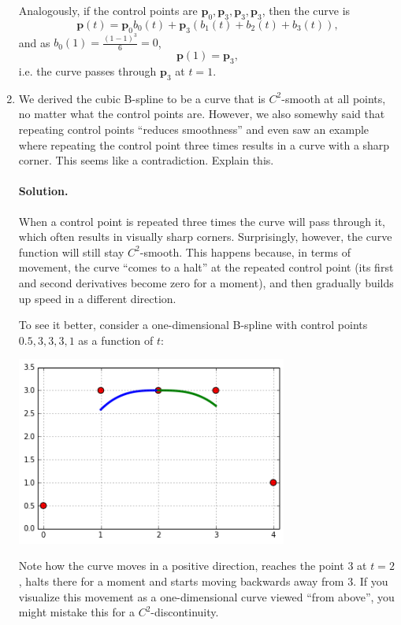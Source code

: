 \documentclass{article}
\newcommand{\bp}{\mathbf{p}}
\begin{document}
\begin{enumerate}
Analogously, if the control points are $\bp_0, \bp_3, \bp_3, \bp_3$, then the curve is
$$
\bp(t) = \bp_0 b_0(t) + \bp_3(b_1(t) + b_2(t) + b_3(t)),
$$
and as $b_0(1) = \frac{(1-1)^3}{6} = 0$,
$$
\bp(1) = \bp_3,
$$
i.e. the curve passes through $\bp_3$ at $t=1$.

\item We derived the cubic B-spline to be a curve that is $C^2$-smooth at all points, no matter what the control points are. However, we also somewhy said that repeating control points ``reduces smoothness'' and even saw an example where repeating the control point three times results in a curve with a sharp corner. This seems like a contradiction. Explain this.

\paragraph{Solution.}
When a control point is repeated three times the curve will pass through it, which often results in visually sharp corners. Surprisingly, however, the curve function will still stay $C^2$-smooth. This happens because, in terms of movement, the curve ``comes to a halt'' at the repeated control point (its first and second derivatives become zero for a moment), and then gradually builds up speed in a different direction.

To see it better, consider a one-dimensional B-spline with control points $0.5, 3, 3, 3, 1$ as a function of $t$:
\begin{center}
\includegraphics[width=0.7\textwidth]{bspline1d.png}
\end{center}

Note how the curve moves in a positive direction, reaches the point $3$ at $t=2$, halts there for a moment and starts moving backwards away from $3$. If you visualize this movement as a one-dimensional curve viewed ``from above'', you might mistake this for a $C^2$-discontinuity.


\end{enumerate}
\end{document}
